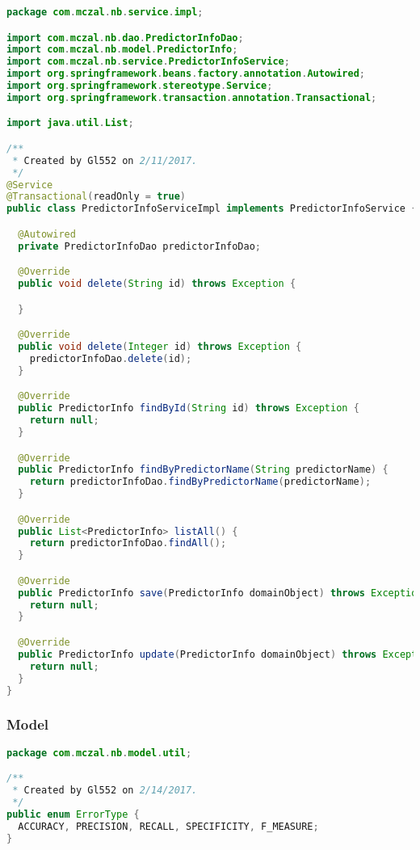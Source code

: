 \begin{lstlisting}[language=Java,basicstyle=\tiny,caption=PredictorInfoServiceImpl.java]
package com.mczal.nb.service.impl;

import com.mczal.nb.dao.PredictorInfoDao;
import com.mczal.nb.model.PredictorInfo;
import com.mczal.nb.service.PredictorInfoService;
import org.springframework.beans.factory.annotation.Autowired;
import org.springframework.stereotype.Service;
import org.springframework.transaction.annotation.Transactional;

import java.util.List;

/**
 * Created by Gl552 on 2/11/2017.
 */
@Service
@Transactional(readOnly = true)
public class PredictorInfoServiceImpl implements PredictorInfoService {

  @Autowired
  private PredictorInfoDao predictorInfoDao;

  @Override
  public void delete(String id) throws Exception {

  }

  @Override
  public void delete(Integer id) throws Exception {
    predictorInfoDao.delete(id);
  }

  @Override
  public PredictorInfo findById(String id) throws Exception {
    return null;
  }

  @Override
  public PredictorInfo findByPredictorName(String predictorName) {
    return predictorInfoDao.findByPredictorName(predictorName);
  }

  @Override
  public List<PredictorInfo> listAll() {
    return predictorInfoDao.findAll();
  }

  @Override
  public PredictorInfo save(PredictorInfo domainObject) throws Exception {
    return null;
  }

  @Override
  public PredictorInfo update(PredictorInfo domainObject) throws Exception {
    return null;
  }
}

\end{lstlisting}


\subsubsection{Model}

\begin{lstlisting}[language=Java,basicstyle=\tiny,caption=ErrorType.java]
package com.mczal.nb.model.util;

/**
 * Created by Gl552 on 2/14/2017.
 */
public enum ErrorType {
  ACCURACY, PRECISION, RECALL, SPECIFICITY, F_MEASURE;
}

\end{lstlisting}


